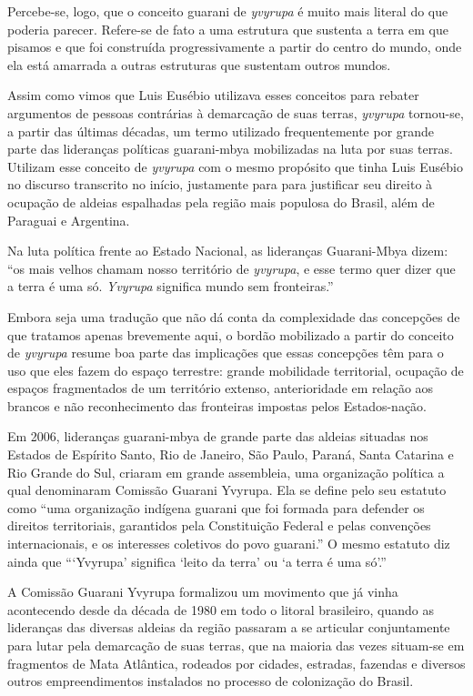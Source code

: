 Percebe-se, logo, que o conceito guarani de \emph{yvyrupa} é muito mais literal
do que poderia parecer. Refere-se de fato a uma estrutura que sustenta
a terra em que pisamos e que foi construída progressivamente a partir
do centro do mundo, onde ela está amarrada a outras estruturas que
sustentam outros mundos.

Assim como vimos que Luis Eusébio utilizava esses conceitos para rebater
argumentos de pessoas contrárias à demarcação de suas terras, \emph{yvyrupa}
tornou-se, a partir das últimas décadas, um termo utilizado
frequentemente por grande parte das lideranças políticas guarani-mbya
mobilizadas na luta por suas terras. Utilizam esse conceito de \emph{yvyrupa}
com o mesmo propósito que tinha Luis Eusébio no discurso transcrito no 
início, justamente para para justificar seu direito à ocupação de
aldeias espalhadas pela região mais populosa do Brasil, além de
Paraguai e Argentina.

Na luta política frente ao Estado Nacional, as lideranças Guarani-Mbya
dizem: ``os mais velhos chamam nosso território de \emph{yvyrupa}, e esse termo
quer dizer que a terra é uma só. \emph{Yvyrupa} significa mundo sem
fronteiras.''

Embora seja uma tradução que não dá conta da complexidade das concepções
de que tratamos apenas brevemente aqui, o bordão mobilizado a partir do
conceito de \emph{yvyrupa} resume boa parte das implicações que essas
concepções têm para o uso que eles fazem do espaço terrestre: grande
mobilidade territorial, ocupação de espaços fragmentados de um
território extenso, anterioridade em relação aos brancos e não
reconhecimento das fronteiras impostas pelos Estados-nação.

Em 2006, lideranças guarani-mbya de grande parte das aldeias situadas
nos Estados de Espírito Santo, Rio de Janeiro, São Paulo, Paraná, Santa
Catarina e Rio Grande do Sul, criaram em grande assembleia, uma
organização política a qual denominaram Comissão Guarani Yvyrupa. Ela
se define pelo seu estatuto como ``uma organização indígena guarani que
foi formada para defender os direitos territoriais, garantidos pela
Constituição Federal e pelas convenções internacionais, e os interesses
coletivos do povo guarani.'' O mesmo estatuto diz ainda que ``‘Yvyrupa’ 
significa ‘leito da terra’ ou ‘a terra é uma só’.''

A Comissão Guarani Yvyrupa formalizou um movimento que já vinha
acontecendo desde da década de 1980 em todo o litoral brasileiro,
quando as lideranças das diversas aldeias da região passaram a se
articular conjuntamente para lutar pela demarcação de suas terras, que
na maioria das vezes situam-se em fragmentos de Mata Atlântica,
rodeados por cidades, estradas, fazendas e diversos outros
empreendimentos instalados no processo de colonização do Brasil.

